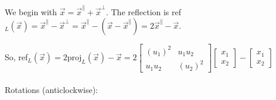 \documentclass[12pt]{article}
\begin{document}
We begin with $\vec{x}=\vec{x}^\parallel+\vec{x}^\perp$. The reflection is ref$_L(\vec{x})=\vec{x}^\parallel-\vec{x}^\perp=\vec{x}^\parallel-(\vec{x}-\vec{x}^\parallel)=2\vec{x}^\parallel -\vec{x}$.

So, ref$_L(\vec{x})=2\text{proj}_L(\vec{x})-\vec{x}=2\begin{bmatrix}(u_1)^2 & u_1u_2\\u_1u_2 & (u_2)^2\end{bmatrix}\begin{bmatrix}x_1\\x_2\end{bmatrix}-\begin{bmatrix}x_1\\x_2\end{bmatrix}$\\\\

Rotations (anticlockwise):
\end{document}
